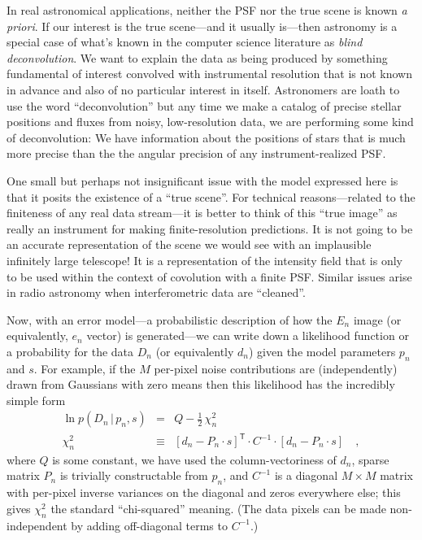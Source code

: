 \documentclass[12pt,preprint]{aastex}
\newcommand{\foreign}[1]{\emph{#1}}
\newcommand{\given}{\,|\,}
\newcommand{\transpose}[1]{{#1}^{\mathsf{T}}}
\newcommand{\data}{\ensuremath{D}}
\begin{document}
In real astronomical applications, neither the PSF nor the true scene
is known \foreign{a priori}.  If our interest is the true scene---and
it usually is---then astronomy is a special case of what's known in
the computer science literature as \emph{blind deconvolution}.  We
want to explain the data as being produced by something fundamental of
interest convolved with instrumental resolution that is not known in
advance and also of no particular interest in itself.  Astronomers are
loath to use the word ``deconvolution'' but any time we make a catalog
of precise stellar positions and fluxes from noisy, low-resolution
data, we are performing some kind of deconvolution: We have
information about the positions of stars that is much more precise
than the the angular precision of any instrument-realized PSF.

One small but perhaps not insignificant issue with the model expressed
here is that it posits the existence of a ``true scene''.  For
technical reasons---related to the finiteness of any real data
stream---it is better to think of this ``true image'' as really an
instrument for making finite-resolution predictions.  It is not going
to be an accurate representation of the scene we would see with an
implausible infinitely large telescope!  It is a representation of the
intensity field that is only to be used within the context of
covolution with a finite PSF.  Similar issues arise in radio astronomy
when interferometric data are ``cleaned''.

Now, with an error model---a probabilistic description of how the
$E_n$ image (or equivalently, $e_n$ vector) is generated---we can
write down a likelihood function or a probability for the data $\data_n$
(or equivalently $d_n$) given the model parameters $p_n$ and $s$.  For
example, if the $M$ per-pixel noise contributions are (independently)
drawn from Gaussians with zero means then this likelihood has the
incredibly simple form
\begin{eqnarray}\displaystyle
\ln p(\data_n\given p_n, s) &=& Q - \frac{1}{2}\,\chi^2_n
\\
\chi^2_n &\equiv& \transpose{[d_n - P_n \cdot s]} \cdot C^{-1} \cdot [d_n - P_n \cdot s]
\quad ,
\end{eqnarray}
where $Q$ is some constant, we have used the column-vectoriness of
$d_n$, sparse matrix $P_n$ is trivially constructable from $p_n$, and
$C^{-1}$ is a diagonal $M\times M$ matrix with per-pixel inverse
variances on the diagonal and zeros everywhere else; this gives
$\chi^2_n$ the standard ``chi-squared'' meaning.  (The data pixels can
be made non-independent by adding off-diagonal terms to $C^{-1}$.)
\end{document}
